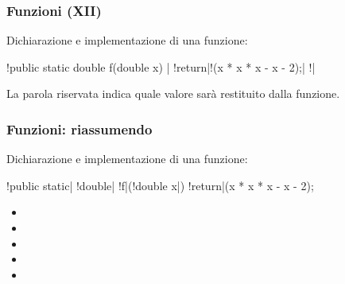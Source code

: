 \begin{frame}[fragile]\frametitle{Funzioni (XII)}

  Dichiarazione e implementazione di una funzione:
  \begin{JavaCodePlain}[commandchars=\\!|]
  \Grey!public static double f(double x) {|
      \Red!return|\Grey!(x * x * x - x - 2);|
  \Grey!}|
  \end{JavaCodePlain}

  La parola riservata  indica quale valore sarà restituito dalla funzione.

\end{frame}

\begin{frame}[fragile]\frametitle{Funzioni: riassumendo}

  Dichiarazione e implementazione di una funzione:
  \begin{JavaCodePlain}[commandchars=\\!|]
  \Red!public static| \Green!double| \Violet!f|(\Blue!double x|) {
      \Brown!return|(x * x * x - x - 2);
  }
  \end{JavaCodePlain}

  \begin{itemize}
   \item {}
   \item {}
   \item {}
   \item {}
   \item {}
  \end{itemize}

\end{frame}

